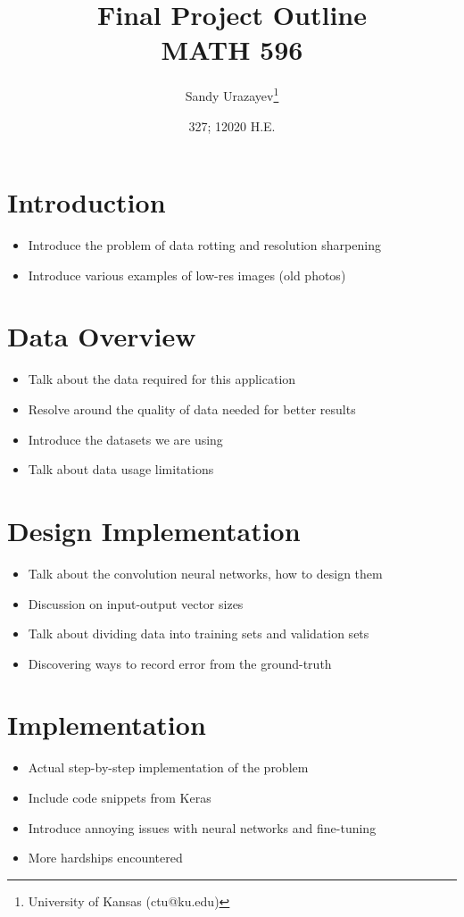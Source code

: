 \documentclass[12pt]{article}
\author{Sandy Urazayev\thanks{University of Kansas (ctu@ku.edu)}}
\date{327; 12020 H.E.}
\title{Final Project Outline\\\medskip
\large MATH 596}
\begin{document}
\maketitle
\section*{Introduction}
\label{sec:org5b6727a}
\begin{itemize}
\item Introduce the problem of data rotting and resolution sharpening
\item Introduce various examples of low-res images (old photos)
\end{itemize}

\section*{Data Overview}
\label{sec:orgee1b949}
\begin{itemize}
\item Talk about the data required for this application
\item Resolve around the quality of data needed for better results
\item Introduce the datasets we are using
\item Talk about data usage limitations
\end{itemize}

\section*{Design Implementation}
\label{sec:org5398d36}
\begin{itemize}
\item Talk about the convolution neural networks, how to design them
\item Discussion on input-output vector sizes
\item Talk about dividing data into training sets and validation sets
\item Discovering ways to record error from the ground-truth
\end{itemize}

\section*{Implementation}
\label{sec:org310c4b6}
\begin{itemize}
\item Actual step-by-step implementation of the problem
\item Include code snippets from Keras
\item Introduce annoying issues with neural networks and fine-tuning
\item More hardships encountered
\end{itemize}
\end{document}
